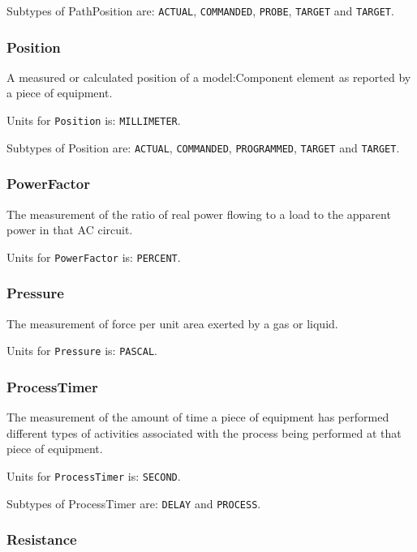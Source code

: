 Subtypes of PathPosition are: \texttt{ACTUAL}, \texttt{COMMANDED}, \texttt{PROBE}, \texttt{TARGET} and \texttt{TARGET}. 
\FloatBarrier

\subsubsection{Position}
  \label{sec:Position}


A measured or calculated position of a {model:Component} element as reported by a piece of equipment.


Units for \texttt{Position} is: \texttt{MILLIMETER}.


Subtypes of Position are: \texttt{ACTUAL}, \texttt{COMMANDED}, \texttt{PROGRAMMED}, \texttt{TARGET} and \texttt{TARGET}. 
\FloatBarrier

\subsubsection{PowerFactor}
  \label{sec:PowerFactor}


The measurement of the ratio of real power flowing to a load to the apparent power in that AC circuit.


Units for \texttt{PowerFactor} is: \texttt{PERCENT}.

\FloatBarrier

\subsubsection{Pressure}
  \label{sec:Pressure}


The measurement of force per unit area exerted by a gas or liquid.


Units for \texttt{Pressure} is: \texttt{PASCAL}.

\FloatBarrier

\subsubsection{ProcessTimer}
  \label{sec:ProcessTimer}


The measurement of the amount of time a piece of equipment has performed different types of activities associated with the process being performed at that piece of equipment.


Units for \texttt{ProcessTimer} is: \texttt{SECOND}.


Subtypes of ProcessTimer are: \texttt{DELAY} and \texttt{PROCESS}. 
\FloatBarrier

\subsubsection{Resistance}
  \label{sec:Resistance}


